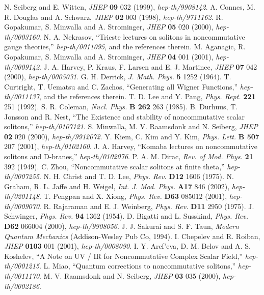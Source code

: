\documentclass[a4paper,a4paper]{article}
\begin{document}
\newpage
\begin{thebibliography}{Ref}
 N. Seiberg and E. Witten, {\sl JHEP} {\bf 09} 032 (1999), {\it hep-th/9908142}.
 A. Connes, M. R. Douglas and A. Schwarz, {\sl JHEP} {\bf 02} 003 (1998), {\it hep-th/9711162}. 
 R. Gopakumar, S. Minwalla and A. Strominger, {\sl JHEP} {\bf 05} 020 (2000), {\it hep-th/0003160}.
 N. A. Nekrasov, ``Trieste lectures on solitons in noncommutative gauge theories,'' 
{\it hep-th/0011095}, and the references therein.
 M. Aganagic, R. Gopakumar, S. Minwalla and A. Strominger, {\sl JHEP} {\bf 04} 001 (2001), 
{\it hep-th/0009142}. 
 J. A. Harvey, P. Kraus, F. Larsen and E. J. Martinec, {\sl JHEP} {\bf 07} 042 (2000), 
{\it hep-th/0005031}. 
 G. H. Derrick, {\sl J. Math. Phys.} {\bf 5} 1252 (1964). 
 T. Curtright, T. Uematsu and C. Zachos, ``Generating all Wigner Functions,'' {\it hep-th/0011137}, and 
the references therein.
 T. D. Lee and Y. Pang, {\sl Phys. Rept.} {\bf 221} 251 (1992). 
 S. R. Coleman, {\sl Nucl. Phys.} {\bf B 262} 263 (1985).
 B. Durhuus, T. Jonsson and R. Nest, 
``The Existence and stability of noncommutative scalar solitons,'' {\it hep-th/0107121}.
 S. Minwalla, M. V. Raamsdonk and N. Seiberg, {\sl JHEP} {\bf 02} 020 (2000), {\it hep-th/9912072}.
 Y. Kiem, C. Kim and Y. Kim, {\sl Phys. Lett.} {\bf B 507} 207 (2001), {\it hep-th/0102160}. 
 J. A. Harvey, ``Komaba lectures on noncommutative solitons and D-branes,'' {\it hep-th/0102076}.
 P. A. M. Dirac, {\sl Rev. of Mod. Phys.} {\bf 21} 392 (1949).
 C. Zhou, ``Noncommutative scalar solitons at finite theta,'' {\it hep-th/0007255}.
 N. H. Christ and T. D. Lee, {\sl Phys. Rev.} {\bf D12} 1606 (1975).
 N. Graham, R. L. Jaffe and H. Weigel, {\sl Int. J. Mod. Phys.} {\bf A17} 846 (2002), 
{\it hep-th/0201148}.
 T. Pengpan and X. Xiong, {\sl Phys. Rev.} {\bf D63} 085012 (2001), {\it hep-th/0009070}.
 R. Rajaraman and E. J. Weinberg, {\sl Phys. Rev.} {\bf D11} 2950 (1975).
 J. Schwinger, {\sl Phys. Rev.} {\bf 94} 1362 (1954).
 D. Bigatti and L. Susskind, {\sl Phys. Rev.} {\bf D62} 066004 (2000), {\it hep-th/9908056}.
 J. J. Sakurai and S. F. Taun, {\sl Modern Quantum Mechanics} (Addison-Wesley Pub Co, 1994).
 I. Chepelev and R. Roiban, {\sl JHEP} {\bf 0103} 001 (2001), {\it hep-th/0008090}.
 I. Y. Aref'eva, D. M. Belov and A. S. Koshelev,
``A Note on UV / IR for Noncommutative Complex Scalar Field,'' {\it hep-th/0001215}.
 L. Miao, ``Quantum corrections to noncommutative solitons,'' {\it hep-th/0011170}.
 M. V. Raamsdonk and N. Seiberg, {\sl JHEP} {\bf 03} 035 (2000), {\it hep-th/0002186}.
\end{thebibliography}
\end{document}
